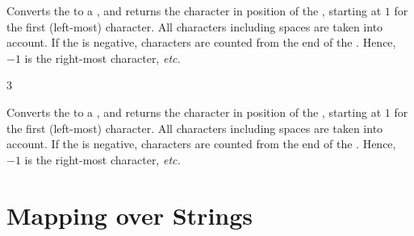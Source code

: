\documentclass[oneside]{book}
\begin{document}
\begin{function}{\strItem}
\begin{syntax}
  
\end{syntax}
Converts the  to a ,
and returns the character in position  of
the , starting at $1$ for the first (left-most)
character. All characters including spaces are taken into account.
If the  is negative,
characters are counted from the end of the . Hence,
$-1$ is the right-most character, \emph{etc.}
\begin{demohigh}
 {3}
\end{demohigh}
\end{function}

\begin{function}{\strVarItem}
\begin{syntax}
  
\end{syntax}
Converts the  to a ,
and returns the character in position  of
the , starting at $1$ for the first (left-most)
character. All characters including spaces are taken into account.
If the  is negative,
characters are counted from the end of the . Hence,
$-1$ is the right-most character, \emph{etc.}
\begin{demohigh}
\strSet {}
\strVarItem {}
\end{demohigh}
\end{function}

\section{Mapping over Strings}


\end{document}
